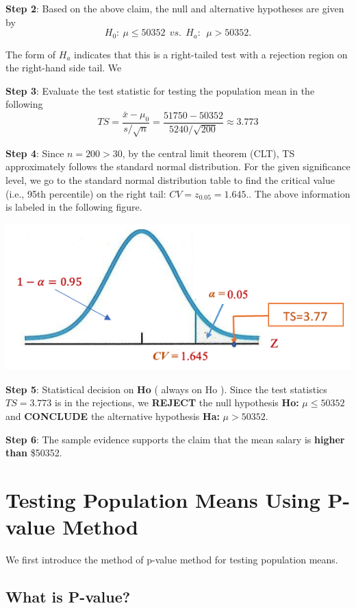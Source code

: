 \documentclass[
]{book}
\begin{document}
\textbf{Step 2}: Based on the above claim, the null and alternative hypotheses are given by
\[H_0:  \ \mu \le 50352    \  \ vs.  \  \ H_a: \  \ \mu > 50352.\]

The form of \(H_a\) indicates that this is a right-tailed test with a rejection region on the right-hand side tail. We

\textbf{Step 3}: Evaluate the test statistic for testing the population mean in the following
\[TS = \frac{\bar{x} - \mu_0}{s/\sqrt{n}} = \frac{51750 - 50352}{5240/\sqrt{200}} \approx 3.773\]

\textbf{Step 4}: Since \(n = 200 > 30\), by the central limit theorem (CLT), TS approximately follows the standard normal distribution. For the given significance level, we go to the standard normal distribution table to find the critical value (i.e., 95th percentile) on the right tail: \(CV = z_{0.05} = 1.645.\). The above information is labeled in the following figure.

\begin{center}\includegraphics[width=0.5\linewidth]{week09/example01} \end{center}

\textbf{Step 5}: Statistical decision on \textbf{Ho} ( always on Ho ).
Since the test statistics \(TS = 3.773\) is in the rejections, we \textbf{REJECT} the null hypothesis \textbf{Ho: } \(\mu \le 50352\) and \textbf{CONCLUDE} the alternative hypothesis \textbf{Ha: } \(\mu > 50352\).

\textbf{Step 6}: The sample evidence supports the claim that the mean salary is \textbf{higher than} \$50352.

\hfill\break

\hypertarget{testing-population-means-using-p-value-method}{%
\section{Testing Population Means Using P-value Method}\label{testing-population-means-using-p-value-method}}

We first introduce the method of p-value method for testing population means.

\hypertarget{what-is-p-value}{%
\subsection{What is P-value?}\label{what-is-p-value}}
\end{document}
